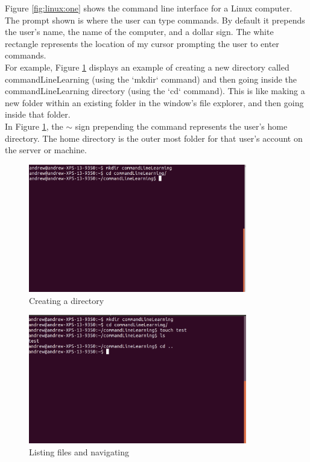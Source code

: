 Figure \ref{fig:linux:one} shows the command line interface for a Linux computer. The prompt shown is where the user can type commands. By default it prepends the user’s name, the name of the computer, and a dollar sign. The white rectangle represents the location of my cursor prompting the user to enter commands. \\

For example, Figure \ref{fig:linux:two} displays an example of creating a new directory called commandLineLearning (using the `mkdir` command) and then going inside the commandLineLearning directory (using the `cd` command). This is like making a new folder within an existing folder in the window’s file explorer, and then going inside that folder. \\

In Figure \ref{fig:linux:two}, the $\sim$ sign prepending the command represents the user’s home directory. The home directory is the outer most folder for that user’s account on the server or machine. \\

\begin{figure}
	\centering
	\includegraphics[width=0.85\textwidth]{images/commandLineTwo.png}
	\caption{Creating a directory}
	\label{fig:linux:two}
\end{figure}

\begin{figure}
	\centering
	\includegraphics[width=0.85\textwidth]{images/commandLineThree.png}
	\caption{Listing files and navigating}
	\label{fig:linux:three}
\end{figure}

